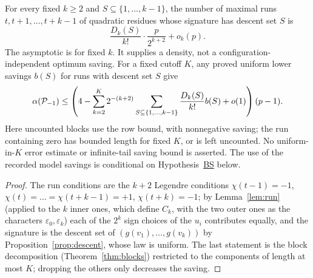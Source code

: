 \begin{corollary}\label{cor:rundensity}
For every fixed $k\ge2$ and $S\subseteq\{1,\dots,k-1\}$, the number of maximal runs $t,t+1,\dots,t+k-1$ of quadratic residues whose
signature has descent set $S$ is
\[
 \frac{D_k(S)}{k!}\cdot\frac p{2^{k+2}}+o_k(p).
\]
The asymptotic is for fixed $k$.  It supplies a density, not a configuration-independent optimum saving.
For a fixed cutoff $K$, any proved uniform lower savings $b(S)$ for runs with descent set $S$ give
\[
 \alpha(\mathcal{P}_{-1})\le\left(4-\sum_{k=2}^K2^{-(k+2)}
 \sum_{S\subseteq\{1,\dots,k-1\}}\frac{D_k(S)}{k!}b(S)+o(1)\right)(p-1).
\]
Here uncounted blocks use the row bound, with nonnegative saving; the run containing zero has bounded length for fixed $K$, or is left uncounted.
No uniform-in-$K$ error estimate or infinite-tail saving bound is asserted.  The use of the recorded model savings is conditional on Hypothesis~\hyperref[hyp:block]{BS} below.
\end{corollary}
\begin{proof}
The run conditions are the $k+2$ Legendre conditions $\chi(t-1)=-1$, $\chi(t)=\dots=\chi(t+k-1)=+1$, $\chi(t+k)=-1$; by Lemma~\ref{lem:run}
(applied to the $k$ inner ones, which define $C_k$, with the two outer ones as the characters $\varepsilon_0,\varepsilon_k$) each of the $2^k$
sign choices of the $u_i$ contributes equally, and the signature is the descent set of $(g(v_1),\dots,g(v_k))$ by
Proposition~\ref{prop:descent}, whose law is uniform.  The last statement is the block decomposition (Theorem~\ref{thm:blocks}) restricted
to the components of length at most $K$; dropping the others only decreases the saving.
\end{proof}
